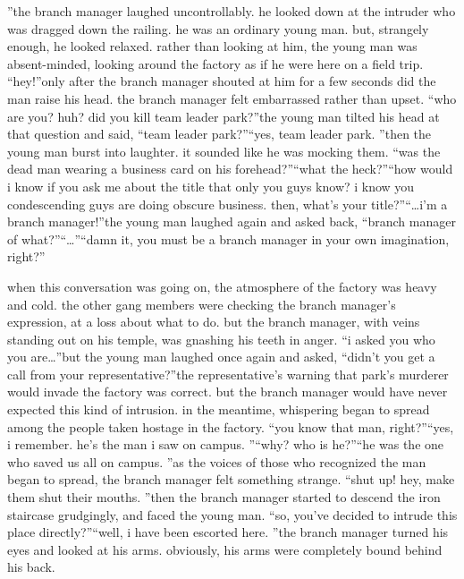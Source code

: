 ”the branch manager laughed uncontrollably.
 he looked down at the intruder who was dragged down the railing.
 he was an ordinary young man.
 but, strangely enough, he looked relaxed.
rather than looking at him, the young man was absent-minded, looking around the factory as if he were here on a field trip.
“hey!”only after the branch manager shouted at him for a few seconds did the man raise his head.
 the branch manager felt embarrassed rather than upset.
“who are you? huh? did you kill team leader park?”the young man tilted his head at that question and said, “team leader park?”“yes, team leader park.
”then the young man burst into laughter.
 it sounded like he was mocking them.
“was the dead man wearing a business card on his forehead?”“what the heck?”“how would i know if you ask me about the title that only you guys know? i know you condescending guys are doing obscure business.
 then, what’s your title?”“…i’m a branch manager!”the young man laughed again and asked back, “branch manager of what?”“…”“damn it, you must be a branch manager in your own imagination, right?”

when this conversation was going on, the atmosphere of the factory was heavy and cold.
the other gang members were checking the branch manager’s expression, at a loss about what to do.
 but the branch manager, with veins standing out on his temple, was gnashing his teeth in anger.
“i asked you who you are…”but the young man laughed once again and asked, “didn’t you get a call from your representative?”the representative’s warning that park’s murderer would invade the factory was correct.
but the branch manager would have never expected this kind of intrusion.
in the meantime, whispering began to spread among the people taken hostage in the factory.
“you know that man, right?”“yes, i remember.
 he’s the man i saw on campus.
”“why? who is he?”“he was the one who saved us all on campus.
”as the voices of those who recognized the man began to spread, the branch manager felt something strange.
“shut up! hey, make them shut their mouths.
”then the branch manager started to descend the iron staircase grudgingly, and faced the young man.
“so, you’ve decided to intrude this place directly?”“well, i have been escorted here.
”the branch manager turned his eyes and looked at his arms.
 obviously, his arms were completely bound behind his back.
 

 